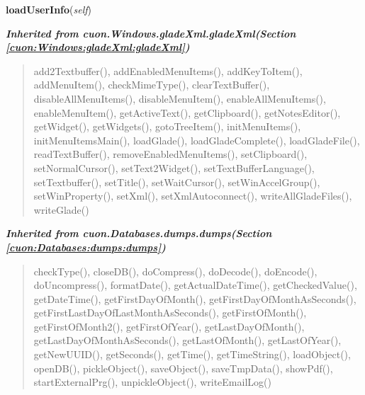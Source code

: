     \label{cuon:Windows:rawWindow:rawWindow:loadUserInfo}

    \vspace{0.5ex}

\hspace{.8\funcindent}\begin{boxedminipage}{\funcwidth}

    \raggedright \textbf{loadUserInfo}(\textit{self})

\setlength{\parskip}{2ex}
\setlength{\parskip}{1ex}
    \end{boxedminipage}


\large{\textbf{\textit{Inherited from cuon.Windows.gladeXml.gladeXml\textit{(Section \ref{cuon:Windows:gladeXml:gladeXml})}}}}

\begin{quote}
add2Textbuffer(), addEnabledMenuItems(), addKeyToItem(), addMenuItem(), checkMimeType(), clearTextBuffer(), disableAllMenuItems(), disableMenuItem(), enableAllMenuItems(), enableMenuItem(), getActiveText(), getClipboard(), getNotesEditor(), getWidget(), getWidgets(), gotoTreeItem(), initMenuItems(), initMenuItemsMain(), loadGlade(), loadGladeComplete(), loadGladeFile(), readTextBuffer(), removeEnabledMenuItems(), setClipboard(), setNormalCursor(), setText2Widget(), setTextBufferLanguage(), setTextbuffer(), setTitle(), setWaitCursor(), setWinAccelGroup(), setWinProperty(), setXml(), setXmlAutoconnect(), writeAllGladeFiles(), writeGlade()
\end{quote}

\large{\textbf{\textit{Inherited from cuon.Databases.dumps.dumps\textit{(Section \ref{cuon:Databases:dumps:dumps})}}}}

\begin{quote}
checkType(), closeDB(), doCompress(), doDecode(), doEncode(), doUncompress(), formatDate(), getActualDateTime(), getCheckedValue(), getDateTime(), getFirstDayOfMonth(), getFirstDayOfMonthAsSeconds(), getFirstLastDayOfLastMonthAsSeconds(), getFirstOfMonth(), getFirstOfMonth2(), getFirstOfYear(), getLastDayOfMonth(), getLastDayOfMonthAsSeconds(), getLastOfMonth(), getLastOfYear(), getNewUUID(), getSeconds(), getTime(), getTimeString(), loadObject(), openDB(), pickleObject(), saveObject(), saveTmpData(), showPdf(), startExternalPrg(), unpickleObject(), writeEmailLog()
\end{quote}
